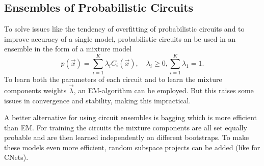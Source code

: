 %
%
%
%
%

		\subsection{Ensembles of Probabilistic Circuits}
			To solve issues like the tendency of overfitting of probabilistic circuits and to improve accuracy of a single model, probabilistic circuits an be used in an ensemble in the form of a mixture model
			\begin{equation}
				p(\vec{x}) = \sum_{i = 1}^{K} \lambda_i C_i(\vec{x}),\quad \lambda_i \geq 0, \sum_{i = 1}^{K} \lambda_1 = 1.
			\end{equation}
			To learn both the parameters of each circuit and to learn the mixture components weights \(\vec{\lambda}\), an EM-algorithm can be employed. But this raises some issues in convergence and stability, making this impractical.

			A better alternative for using circuit ensembles is bagging which is more efficient than EM. For training the circuits the mixture components are all set equally probable and are then learned independently on different bootstraps. To make these models even more efficient, random subspace projects can be added (like for CNets).

